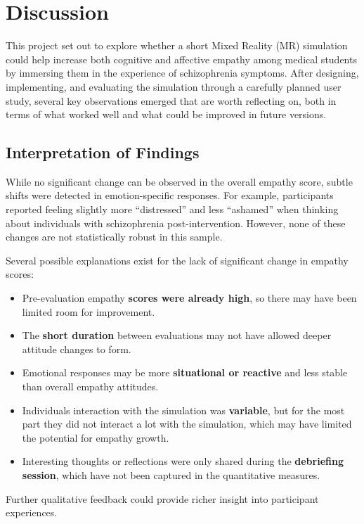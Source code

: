 \chapter{Discussion}
\label{ch:discussion}

This project set out to explore whether a short Mixed Reality (MR) simulation could help increase both cognitive and affective empathy among medical students by immersing them in the experience of schizophrenia symptoms. After designing, implementing, and evaluating the simulation through a carefully planned user study, several key observations emerged that are worth reflecting on, both in terms of what worked well and what could be improved in future versions.

\section{Interpretation of Findings}

While no significant change can be observed in the overall empathy score, subtle shifts were detected in emotion-specific responses. For example, participants reported feeling slightly more “distressed” and less “ashamed” when thinking about individuals with schizophrenia post-intervention. However, none of these changes are not statistically robust in this sample.

Several possible explanations exist for the lack of significant change in empathy scores:
\begin{itemize}
  \item Pre-evaluation empathy \textbf{scores were already high}, so there may have been limited room for improvement.
  \item The \textbf{short duration} between evaluations may not have allowed deeper attitude changes to form.
  \item Emotional responses may be more \textbf{situational or reactive} and less stable than overall empathy attitudes.
  \item Individuals interaction with the simulation was \textbf{variable}, but for the most part they did not interact a lot with the simulation, which may have limited the potential for empathy growth.
  \item Interesting thoughts or reflections were only shared during the \textbf{debriefing session}, which have not been captured in the quantitative measures.
\end{itemize}

Further qualitative feedback could provide richer insight into participant experiences.


